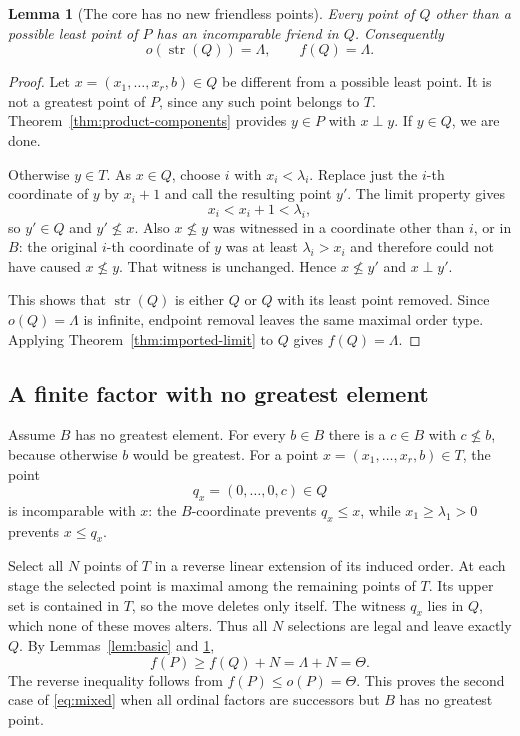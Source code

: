\documentclass[11pt,letterpaper]{article}
\newtheorem{lemma}[theorem]{Lemma}
\theoremstyle{definition}
\theoremstyle{remark}
\newcommand{\str}{\operatorname{str}}
\begin{document}
\begin{lemma}[The core has no new friendless points]\label{lem:core-stripped}
Every point of $Q$ other than a possible least point of $P$ has an
incomparable friend in $Q$. Consequently
\[
 o(\str(Q))=\Lambda,\qquad f(Q)=\Lambda.
\]
\end{lemma}
\begin{proof}
Let $x=(x_1,\ldots,x_r,b)\in Q$ be different from a possible least point.
It is not a greatest point of $P$, since any such point belongs to $T$.
Theorem~\ref{thm:product-components} provides $y\in P$ with $x\perp y$.
If $y\in Q$, we are done.

Otherwise $y\in T$. As $x\in Q$, choose $i$ with $x_i<\lambda_i$.
Replace just the $i$-th coordinate of $y$ by $x_i+1$ and call the resulting
point $y'$. The limit property gives
\[
 x_i<x_i+1<\lambda_i,
\]
so $y'\in Q$ and $y'\not\le x$. Also $x\not\le y$ was witnessed in a
coordinate other than $i$, or in $B$: the original $i$-th coordinate of
$y$ was at least $\lambda_i>x_i$ and therefore could not have caused
$x\not\le y$. That witness is unchanged. Hence $x\not\le y'$ and
$x\perp y'$.

This shows that $\str(Q)$ is either $Q$ or $Q$ with its least point
removed. Since $o(Q)=\Lambda$ is infinite, endpoint removal leaves the
same maximal order type. Applying Theorem~\ref{thm:imported-limit} to $Q$
gives $f(Q)=\Lambda$.
\end{proof}

\subsection{A finite factor with no greatest element}
Assume $B$ has no greatest element. For every $b\in B$ there is a
$c\in B$ with $c\not\le b$, because otherwise $b$ would be greatest.
For a point $x=(x_1,\ldots,x_r,b)\in T$, the point
\[
 q_x=(0,\ldots,0,c)\in Q
\]
is incomparable with $x$: the $B$-coordinate prevents $q_x\le x$, while
$x_1\ge\lambda_1>0$ prevents $x\le q_x$.

Select all $N$ points of $T$ in a reverse linear extension of its induced
order. At each stage the selected point is maximal among the remaining
points of $T$. Its upper set is contained in $T$, so the move deletes
only itself. The witness $q_x$ lies in $Q$, which none of these moves
alters. Thus all $N$ selections are legal and leave exactly $Q$.
By Lemmas~\ref{lem:basic} and \ref{lem:core-stripped},
\[
 f(P)\ge f(Q)+N=\Lambda+N=\Theta.
\]
The reverse inequality follows from $f(P)\le o(P)=\Theta$. This proves
the second case of \eqref{eq:mixed} when all ordinal factors are successors
but $B$ has no greatest point.
\end{document}
